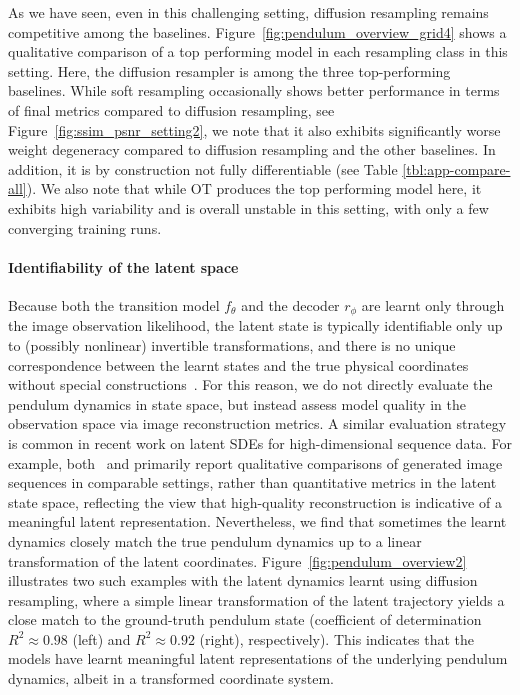 \documentclass{article}
\begin{document}
As we have seen, even in this challenging setting, diffusion resampling remains competitive among the baselines. Figure~\ref{fig:pendulum_overview_grid4} shows a qualitative comparison of a top performing model in each resampling class in this setting. Here, the diffusion resampler is among the three top-performing baselines. While soft resampling occasionally shows better performance in terms of final metrics compared to diffusion resampling, see Figure~\ref{fig:ssim_psnr_setting2}, we note that it also exhibits significantly worse weight degeneracy compared to diffusion resampling and the other baselines. In addition, it is by construction not fully differentiable (see Table \ref{tbl:app-compare-all}). We also note that while OT produces the top performing model here, it exhibits high variability and is overall unstable in this setting, with only a few converging training runs.

\paragraph{Identifiability of the latent space}
Because both the transition model $f_\theta$ and the decoder $r_\phi$ are learnt only through the image observation likelihood, the latent state is typically identifiable only up to (possibly nonlinear) invertible transformations, and there is no unique correspondence between the learnt states and the true physical coordinates without special constructions~\citep[see, e.g.,][for a similar issue]{greydanus2019hamiltonian}.
For this reason, we do not directly evaluate the pendulum dynamics in state space, but instead assess model quality in the observation space via image reconstruction metrics. A similar evaluation strategy is common in recent work on latent SDEs for high-dimensional sequence data. 
For example, both~\citet{Bartosh2025sde} and \citet{Course2023amortized} primarily report qualitative comparisons of generated image sequences in comparable settings, rather than quantitative metrics in the latent state space, reflecting the view that high-quality reconstruction is indicative of a meaningful latent representation. 
Nevertheless, we find that sometimes the learnt dynamics closely match the true pendulum dynamics up to a linear transformation of the latent coordinates. Figure~\ref{fig:pendulum_overview2}
illustrates two such examples with the latent dynamics learnt using diffusion resampling, where a simple linear transformation of the latent trajectory yields a close match to the ground-truth pendulum state (coefficient of determination $R^2 \approx 0.98$ (left) and $R^2 \approx 0.92$ (right), respectively). 
This indicates that the models have learnt meaningful latent representations of the underlying pendulum dynamics, albeit in a transformed coordinate system.
\end{document}

